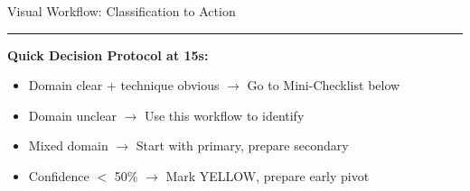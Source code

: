\documentclass{article}
\begin{document}
\begin{classifybox}{Visual Workflow: Classification to Action}
\begin{center}
   \end{center}
   
   \vspace{2mm}
   \hrule
   \vspace{2mm}
   \textbf{Quick Decision Protocol at 15s:}
   \begin{itemize}[nosep]
   \item[$\square$] Domain clear + technique obvious $\rightarrow$ Go to Mini-Checklist below
   \item[$\square$] Domain unclear $\rightarrow$ Use this workflow to identify
   \item[$\square$] Mixed domain $\rightarrow$ Start with primary, prepare secondary
   \item[$\square$] Confidence $<$ 50\% $\rightarrow$ Mark YELLOW, prepare early pivot
   \end{itemize}
\end{classifybox}

\newpage
\end{document}
